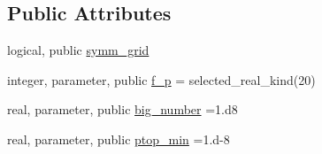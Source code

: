 \subsection*{Public Attributes}
\begin{DoxyCompactItemize}
\item 
logical, public \hyperlink{classfv__grid__utils__mod_a5bf65a4c81568a1f4d7e893be47655a1}{symm\-\_\-grid}
\item 
integer, parameter, public \hyperlink{classfv__grid__utils__mod_a72968a7b4fccc9953a595a4efe712cad}{f\-\_\-p} = selected\-\_\-real\-\_\-kind(20)
\item 
real, parameter, public \hyperlink{classfv__grid__utils__mod_a2152e3d84a5c3e50b27ea7fabeb16580}{big\-\_\-number} =1.d8
\item 
real, parameter, public \hyperlink{classfv__grid__utils__mod_a8363bc8f261396e37744efbbfa91fb7d}{ptop\-\_\-min} =1.d-\/8
\end{DoxyCompactItemize}
